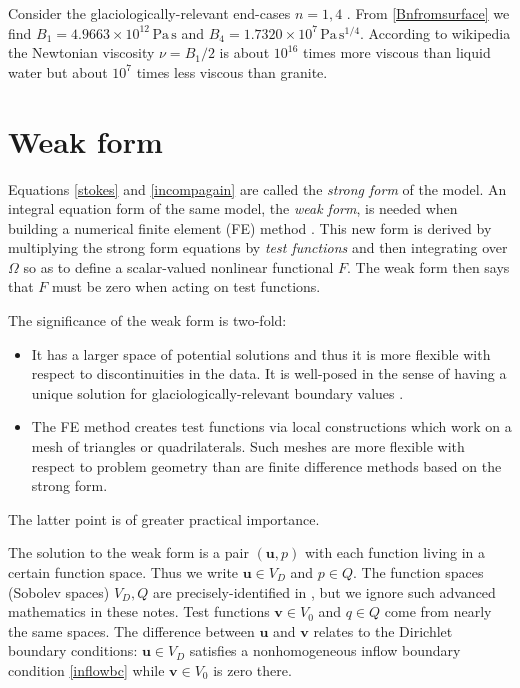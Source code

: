 \documentclass[letterpaper,final,12pt,reqno]{amsart}
\newcommand{\bu}{\mathbf{u}}
\newcommand{\bv}{\mathbf{v}}
\begin{document}
Consider the glaciologically-relevant end-cases $n=1,4$ \cite{GoldsbyKohlstedt2001}.  From \eqref{Bnfromsurface} we find $B_1=4.9663\times 10^{12}\,\text{Pa}\,\text{s}$ and $B_4=1.7320\times 10^{7}\,\text{Pa}\,\text{s}^{1/4}$.  According to wikipedia the Newtonian viscosity $\nu=B_1/2$ is about $10^{16}$ times more viscous than liquid water but about $10^7$ times less viscous than granite.


\section{Weak form} \label{sec:weakform}

Equations \eqref{stokes} and \eqref{incompagain} are called the \emph{strong form} of the model.  An integral equation form of the same model, the \emph{weak form}, is needed when building a numerical finite element (FE) method \cite{Elmanetal2014}.  This new form is derived by multiplying the strong form equations by \emph{test functions} and then integrating over $\Omega$ so as to define a scalar-valued nonlinear functional $F$.  The weak form then says that $F$ must be zero when acting on test functions.

The significance of the weak form is two-fold:
\begin{itemize}
\item It has a larger space of potential solutions and thus it is more flexible with respect to discontinuities in the data.  It is well-posed in the sense of having a unique solution  for glaciologically-relevant boundary values \cite{JouvetRappaz2011}.
\item The FE method creates test functions via local constructions which work on a mesh of triangles or quadrilaterals.  Such meshes are more flexible with respect to problem geometry than are finite difference methods based on the strong form.
\end{itemize}
The latter point is of greater practical importance.

The solution to the weak form is a pair $(\bu,p)$ with each function living in a certain function space.  Thus we write $\bu\in V_D$ and $p \in Q$.  The function spaces (Sobolev spaces) $V_D,Q$ are precisely-identified in \cite{JouvetRappaz2011}, but we ignore such advanced mathematics in these notes.  Test functions $\bv\in V_0$ and $q\in Q$ come from nearly the same spaces.  The difference between $\bu$ and $\bv$ relates to the Dirichlet boundary conditions: $\bu\in V_D$ satisfies a nonhomogeneous inflow boundary condition \eqref{inflowbc} while $\bv\in V_0$ is zero there.
\end{document}
